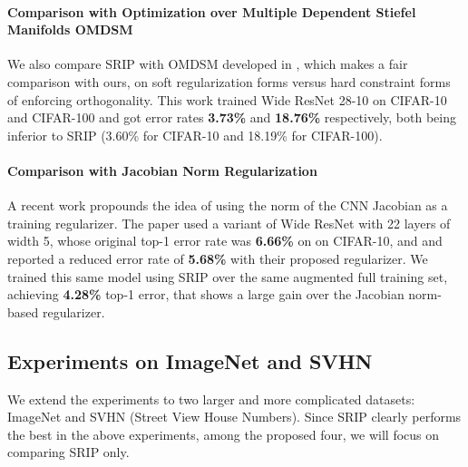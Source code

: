 \documentclass{article}
\begin{document}
\vspace{-0.8em}
\paragraph{Comparison with Optimization over Multiple Dependent Stiefel Manifolds \textbf{OMDSM}}
We also compare SRIP with OMDSM developed in \cite{huang2017orthogonal}, which makes a fair comparison with ours, on soft regularization forms versus hard constraint forms of enforcing orthogonality. This work trained Wide ResNet 28-10 on CIFAR-10 and CIFAR-100 and got error rates \textbf{3.73\%} and \textbf{18.76\%} respectively, both being inferior to SRIP (3.60\% for CIFAR-10 and 18.19\% for CIFAR-100).

\vspace{-0.8em}
\paragraph{Comparison with Jacobian Norm Regularization}
A recent work \cite{sokolic2017robust} propounds the idea of using the norm of the CNN Jacobian as a training regularizer. The paper used a variant of Wide ResNet \cite{zagoruyko2016wide} with 22 layers of width 5, whose original top-1 error rate was \textbf{6.66\%} on on CIFAR-10, and and reported a reduced error rate of \textbf{5.68\%} with their proposed regularizer. We trained this same model using SRIP over the same augmented full training set, achieving \textbf{4.28\%} top-1 error, that shows a large gain over the Jacobian norm-based regularizer.

\subsection{Experiments on ImageNet and SVHN}
We extend the experiments to two larger and more complicated datasets: ImageNet and SVHN (Street View House Numbers). Since SRIP clearly performs the best in the above experiments, among the proposed four, we will focus on comparing SRIP only.
\end{document}
